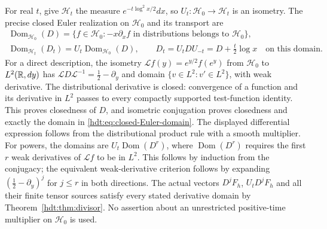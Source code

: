 For real $t$, give $\mathcal H_t$ the measure
$e^{-t\log^2x/2}dx$, so $U_t:\mathcal H_0\to\mathcal H_t$ is an isometry.
The precise closed Euler realization on $\mathcal H_0$ and its transport are
\begin{equation}\label{hdt:eq:closed-Euler-domain}
\begin{gathered}
\operatorname{Dom}_{\mathcal H_0}(D)=
\{f\in\mathcal H_0:-x\partial_xf\text{ in distributions belongs to }\mathcal H_0\},\\
\operatorname{Dom}_{\mathcal H_t}(D_t)=U_t\operatorname{Dom}_{\mathcal H_0}(D),
\qquad D_t=U_tDU_{-t}=D+\tfrac t2\log x
\quad\text{on this domain}.
\end{gathered}
\end{equation}
For a direct description, the isometry
$\mathcal Lf(y)=e^{y/2}f(e^y)$ from $\mathcal H_0$ to $L^2(\mathbb R,dy)$
has $\mathcal L D\mathcal L^{-1}=\tfrac12-\partial_y$ and
domain $\{v\in L^2:v'\in L^2\}$, with weak derivative.
The distributional derivative is closed: convergence of a function
and its derivative in $L^2$ passes to every compactly supported
test-function identity. This proves closedness of $D$, and isometric
conjugation proves closedness and exactly the domain in
\eqref{hdt:eq:closed-Euler-domain}. The displayed differential expression
follows from the distributional product rule with a smooth multiplier.
For powers, the domains are $U_t\operatorname{Dom}(D^r)$, where
$\operatorname{Dom}(D^r)$ requires the first $r$ weak derivatives of
$\mathcal Lf$ to be in $L^2$. This follows by induction from the
conjugacy; the equivalent weak-derivative criterion follows by
expanding $(\tfrac12-\partial_y)^j$ for $j\leq r$ in both
directions. The actual vectors $D^jF_h$, $U_tD^jF_h$ and all their
finite tensor sources satisfy every stated derivative domain by
Theorem~\ref{hdt:thm:divisor}. No assertion about an unrestricted
positive-time multiplier on $\mathcal H_0$ is used.

